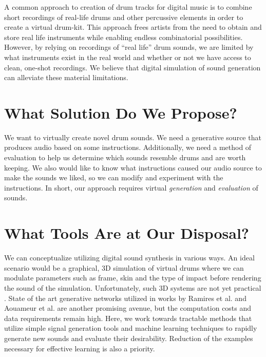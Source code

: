 \documentclass[\main/thesis.tex]{subfiles}
\begin{document}
A common approach to creation of drum tracks for digital music is to combine short recordings of real-life drums and other percussive elements in order to create a virtual drum-kit. This approach frees artists from the need to obtain and store real life instruments while enabling endless combinatorial possibilities. However, by relying on recordings of \enquote{real life} drum sounds, we are limited by what instruments exist in the real world and whether or not we have access to clean, one-shot recordings. We believe that digital simulation of sound generation can alleviate these material limitations. 
 
\section{What Solution Do We Propose?}
We want to virtually create novel drum sounds. We need a generative source that produces audio based on some instructions. Additionally, we need a method of evaluation to help us determine which sounds resemble drums and are worth keeping. We also would like to know what instructions caused our audio source to make the sounds we liked, so we can modify and experiment with the instructions. In short, our approach requires virtual \textit{generation} and \textit{evaluation} of sounds. 

\section{What Tools Are at Our Disposal?}
\label{sec_tools_disposal}
We can conceptualize utilizing digital sound synthesis in various ways. An ideal scenario would be a graphical, 3D simulation of virtual drums where we can modulate parameters such as frame, skin and the type of impact before rendering the sound of the simulation. Unfortunately, such 3D systems are not yet practical \cite{langlois2016toward}. State of the art generative networks utilized in works by Ramires et al. \cite{ramires2020neural} and Aouameur et al.\cite{aouameur2019neural} 
are another promising avenue, but the computation costs and data requirements remain high. Here, we work towards tractable methods that utilize simple signal generation tools and machine learning techniques to rapidly generate new sounds and evaluate their desirability. Reduction of the examples necessary for effective learning is also a priority.
\end{document}
